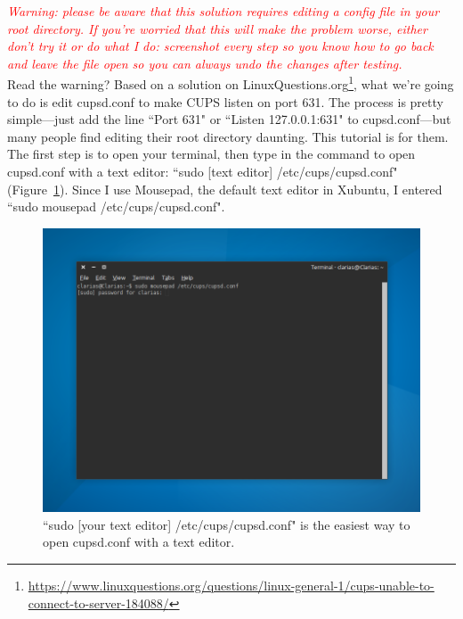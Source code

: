 \documentclass[12pt, a4paper]{article}
\begin{document}
\emph{\textcolor{Red}{Warning: please be aware that this solution requires editing a config file in your root directory. If you're worried that this will make the problem worse, either don't try it or do what I do: screenshot every step so you know how to go back and leave the file open so you can always undo the changes after testing.}}\\

\noindent Read the warning? Based on a solution on LinuxQuestions.org\footnote{\url{https://www.linuxquestions.org/questions/linux-general-1/cups-unable-to-connect-to-server-184088/}}, what we're going to do is edit cupsd.conf to make CUPS listen on port 631. The process is pretty simple---just add the line ``Port 631" or ``Listen 127.0.0.1:631" to cupsd.conf---but many people find editing their root directory daunting. This tutorial is for them.\\

\noindent The first step is to open your terminal, then type in the command to open cupsd.conf with a text editor: ``sudo [text editor] /etc/cups/cupsd.conf" (Figure~\ref{fig12}). Since I use Mousepad, the default text editor in Xubuntu, I entered ``sudo mousepad /etc/cups/cupsd.conf".


\begin{figure}[!h]
  \centering
  \includegraphics[width=1\textwidth]{imgs/unable-to-connect-to-server-2.png}
\caption{``sudo [your text editor] /etc/cups/cupsd.conf" is the easiest way to open cupsd.conf with a text editor.}
  \label{fig12}
\end{figure}
\end{document}
